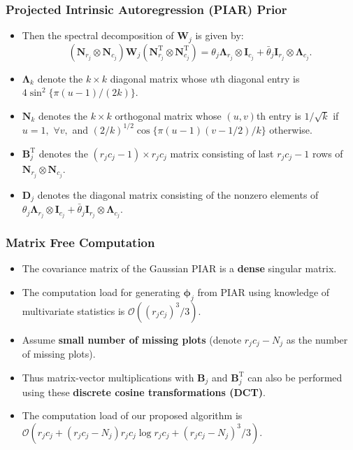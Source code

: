 \documentclass{beamer}
\newcommand{\bB}{\mathbf{B}}
\newcommand{\bD}{\mathbf{D}}
\newcommand{\bLambda}{{\bm\Lambda}}
\newcommand{\bN}{\mathbf{N}}
\newcommand{\bphi}{{\bm\phi}}
\newcommand{\bW}{\mathbf{W}}
\newcommand{\sT}{\mathrm{T}}
\begin{document}
\begin{frame}
	\frametitle{Projected Intrinsic Autoregression (PIAR) Prior}

  	\begin{itemize}
         \item Then the spectral decomposition of $\bW_j$ is given by:
         $$( \bN_{r_j}\otimes\bN_{c_j}) \bW_j ( \bN_{r_j}^\sT \otimes\bN_{c_j}^\sT) = \theta_j\bLambda_{r_j}\otimes\mathbf{I}_{c_j} + \bar\theta_j\mathbf{I}_{r_j}\otimes\bLambda_{c_j}.$$
         \item $\bLambda_k$ denote the $k\times k$ diagonal matrix  whose $u$th diagonal entry is $4\sin^2\{\pi(u-1)/(2k)\}.$
	\item $\bN_k$ denotes the $k\times k$ orthogonal matrix whose $(u,v)$th entry is $1/\sqrt{k}$ if $u=1,$ $\forall v,$ and $(2/k)^{1/2}\cos\{\pi(u-1)(v-1/2)/k\}$ otherwise.
	\item  $\bB_{j}^{\sT}$ denotes the $(r_jc_j-1)\times r_jc_j$ matrix consisting of last $r_jc_j-1$ rows of $ \bN_{r_j}\otimes\bN_{c_j}$.
         \item $\bD_j$ denotes the diagonal matrix consisting of the nonzero elements of $\theta_j\bLambda_{r_j}\otimes\mathbf{I}_{c_j} + \bar\theta_j\mathbf{I}_{r_j}\otimes\bLambda_{c_j}$.
	\end{itemize}
	
\end{frame}







\begin{frame}
	\frametitle{Matrix Free Computation}
	
	\begin{itemize}
	\item  The covariance matrix of the Gaussian PIAR is a \textbf{dense} singular matrix.
	\item The computation load for generating $\bphi_j$ from PIAR using knowledge of multivariate statistics is ${\mathcal O}((r_jc_j)^3/3)$.
	\item Assume \textbf{small number of missing plots} (denote $r_j c_j-N_j$ as the number of missing plots).
	\item Thus matrix-vector multiplications with $\bB_j$ and $\bB^{\sT}_j$ can also be performed using these \textbf{discrete cosine transformations (DCT)}.
	\item The computation load of our proposed algorithm is $\mathcal{O}( r_jc_j + (r_j c_j-N_j) r_j c_j \log r_jc_j +  (r_j c_j-N_j)^3/3)$.	\end{itemize}
	
\end{frame}
\end{document}
